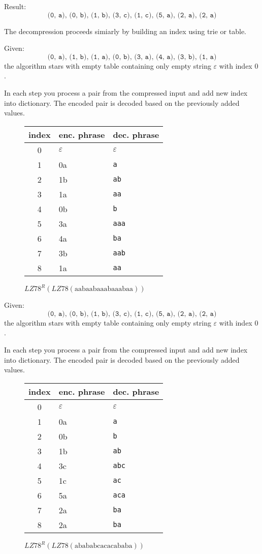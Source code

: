 Result: $$ \texttt{(0, a), (0, b), (1, b), (3, c), (1, c), (5, a), (2, a), (2, a)}$$

The decompression proceeds simiarly by building an index using trie or table.

Given: $$ \texttt{(0, a), (1, b), (1, a), (0, b), (3, a), (4, a), (3, b), (1, a)}$$
the algorithm stars with empty table containing only empty string $\varepsilon$ with index $0$.

In each step you process a pair from the compressed input and add new index into dictionary. The encoded pair is decoded based on the previously added values.

\begin{figure}
  \begin{center}
  \begin{tabular}{c|l|l}
    index & enc. phrase & dec. phrase \\
    \hline
    0 & $\varepsilon$ & $\varepsilon$\\
    1 & 0a & \texttt{a}\\
    2 & 1b & \texttt{ab}\\
    3 & 1a & \texttt{aa}\\
    4 & 0b & \texttt{b}\\
    5 & 3a & \texttt{aaa}\\
    6 & 4a & \texttt{ba}\\
    7 & 3b & \texttt{aab}\\
    8 & 1a & \texttt{aa}\\
  \end{tabular}
  \end{center}
  \caption{$LZ78^R(LZ78(\text{aabaabaaabaaabaa}))$}
\end{figure}

Given: $$ \texttt{(0, a), (0, b), (1, b), (3, c), (1, c), (5, a), (2, a), (2, a)}$$
the algorithm stars with empty table containing only empty string $\varepsilon$ with index $0$.

In each step you process a pair from the compressed input and add new index into dictionary. The encoded pair is decoded based on the previously added values.

\begin{figure}
  \begin{center}
  \begin{tabular}{c|l|l}
    index & enc. phrase & dec. phrase \\
    \hline
    0 & $\varepsilon$ & $\varepsilon$\\
    1 & 0a & \texttt{a}\\
    2 & 0b & \texttt{b}\\
    3 & 1b & \texttt{ab}\\
    4 & 3c & \texttt{abc}\\
    5 & 1c & \texttt{ac}\\
    6 & 5a & \texttt{aca}\\
    7 & 2a & \texttt{ba}\\
    8 & 2a & \texttt{ba}\\
  \end{tabular}
  \end{center}
  \caption{$LZ78^R(LZ78(\text{abababcacacababa}))$}
\end{figure}

